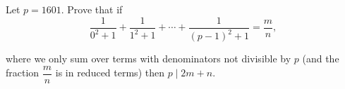 Let $p=1601$. Prove that if\[\dfrac {1} {0^2+1}+\dfrac{1}{1^2+1}+\cdots+\dfrac{1}{(p-1)^2+1}=\dfrac{m} {n},\]

where we only sum over terms with denominators not divisible by $p$ (and the fraction $\dfrac {m} {n}$ is in reduced terms) then $p \mid 2m+n$.